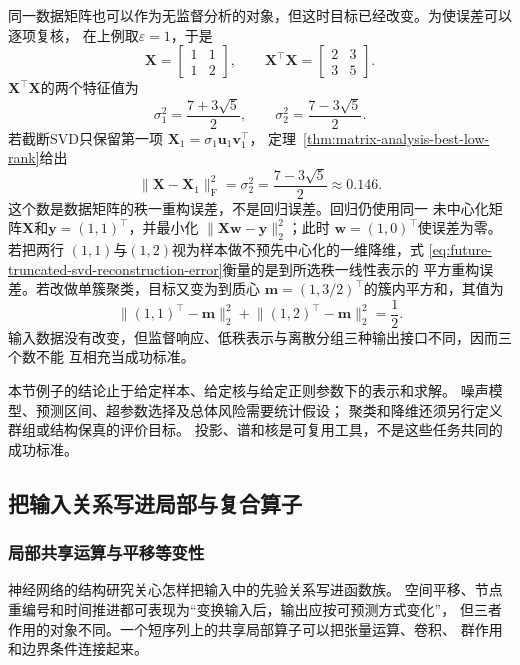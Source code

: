 同一数据矩阵也可以作为无监督分析的对象，但这时目标已经改变。为使误差可以逐项复核，
在上例取\(\varepsilon=1\)，于是
\[
  \bm{X}=
  \begin{bmatrix}
    1&1\\
    1&2
  \end{bmatrix},
  \qquad
  \bm{X}^{\top}\bm{X}=
  \begin{bmatrix}
    2&3\\
    3&5
  \end{bmatrix}.
\]
\(\bm{X}^{\top}\bm{X}\)的两个特征值为
\[
  \sigma_1^2=\frac{7+3\sqrt5}{2},
  \qquad
  \sigma_2^2=\frac{7-3\sqrt5}{2}.
\]
若截断SVD只保留第一项
\(\bm{X}_1=\sigma_1\bm{u}_1\bm{v}_1^{\top}\)，
定理~\ref{thm:matrix-analysis-best-low-rank}给出
\begin{equation}
  \lVert\bm{X}-\bm{X}_1\rVert_{\mathrm F}^2
  =
  \sigma_2^2
  =
  \frac{7-3\sqrt5}{2}
  \approx0.146.
  \label{eq:future-truncated-svd-reconstruction-error}
\end{equation}
这个数是数据矩阵的秩一重构误差，不是回归误差。回归仍使用同一
未中心化矩阵\(\bm{X}\)和\(\bm{y}=(1,1)^{\top}\)，并最小化
\(\lVert\bm{X}\bm{w}-\bm{y}\rVert_2^2\)；此时
\(\bm{w}=(1,0)^{\top}\)使误差为零。若把两行
\((1,1)\)与\((1,2)\)视为样本做不预先中心化的一维降维，式
\eqref{eq:future-truncated-svd-reconstruction-error}衡量的是到所选秩一线性表示的
平方重构误差。若改做单簇聚类，目标又变为到质心
\(\bm m=(1,3/2)^{\top}\)的簇内平方和，其值为
\[
  \lVert(1,1)^{\top}-\bm m\rVert_2^2
  +
  \lVert(1,2)^{\top}-\bm m\rVert_2^2
  =
  \frac12.
\]
输入数据没有改变，但监督响应、低秩表示与离散分组三种输出接口不同，因而三个数不能
互相充当成功标准。

本节例子的结论止于给定样本、给定核与给定正则参数下的表示和求解。
噪声模型、预测区间、超参数选择及总体风险需要统计假设；
聚类和降维还须另行定义群组或结构保真的评价目标。
投影、谱和核是可复用工具，不是这些任务共同的成功标准。

\subsection{把输入关系写进局部与复合算子}
\label{sec:future-neural-structure-representation}

\subsubsection{局部共享运算与平移等变性}
\label{sec:future-local-operations-convolution-equivariance}

神经网络的结构研究关心怎样把输入中的先验关系写进函数族。
空间平移、节点重编号和时间推进都可表现为“变换输入后，输出应按可预测方式变化”，
但三者作用的对象不同。一个短序列上的共享局部算子可以把张量运算、卷积、
群作用和边界条件连接起来。

